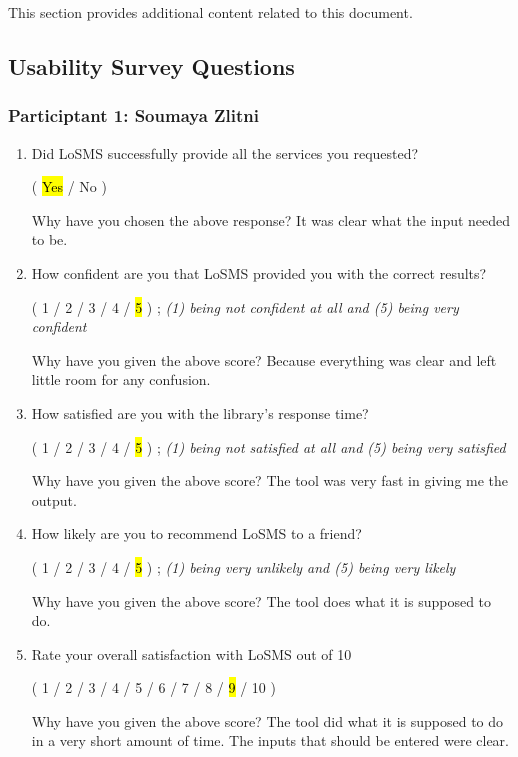 \documentclass[12pt, titlepage]{article}
\newcommand{\famname}{LoSMS}
\begin{document}
This section provides additional content related to this document.

\subsection{Usability Survey Questions} \label{UsabilityTestingQs}

\subsubsection{Participtant 1: Soumaya Zlitni}

\begin{enumerate}
	\item Did \famname{} successfully provide all the services you requested?
	
	(	\hl{Yes}	/	No	)
	
	Why have you chosen the above response? It was clear what the input needed 
	to be.
	
	\item How confident are you that \famname{} provided you with the correct 
	results?
	
	(	1	/	2	/	3	/	4	/	\hl{5}	) ; \textit{(1) being not 
	confident at all and (5) being very confident}
	
	Why have you given the above score? Because everything was clear and left 
	little room for any confusion.
	
	\item How satisfied are you with the library's response time?  
	
	(	1	/	2	/	3	/	4	/	\hl{5}	) ; \textit{(1) being not 
	satisfied at all and (5) being very satisfied} 
	
	Why have you given the above score? The tool was very fast in giving me the 
	output.
	
	\item How likely are you to recommend \famname{} to a friend?
	
	(	1	/	2	/	3	/	4	/	\hl{5}	) ; \textit{(1) being very 
	unlikely and (5) being very likely} 
	
	Why have you given the above score? The tool does what it is supposed to do.
	
	\item Rate your overall satisfaction with \famname{} out of 10 
	
	(	1	/	2	/	3	/	4	/	5	/	6	/	7	/	8	/	\hl{9}	
	/	10	)
	
	Why have you given the above score? The tool did what it is supposed to do 
	in a very short amount of time. The inputs that should be entered were 
	clear.
	\end {enumerate}
\end{document}
